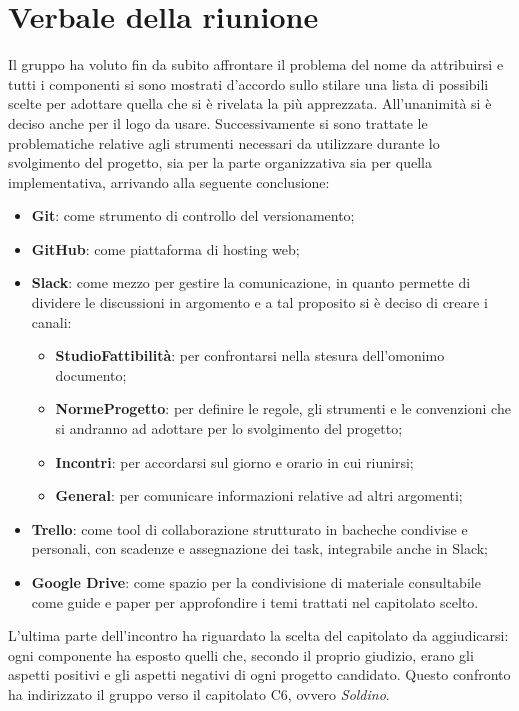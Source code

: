\section{Verbale della riunione}
Il gruppo ha voluto fin da subito affrontare il problema del nome da attribuirsi 
e tutti i componenti si sono mostrati d'accordo sullo stilare una lista di 
possibili scelte per adottare quella che si è rivelata la più apprezzata. 
All'unanimità si è deciso anche per il logo da usare. 
Successivamente si sono trattate le problematiche relative agli strumenti 
necessari da utilizzare durante lo svolgimento del progetto, sia per la parte 
organizzativa sia per quella implementativa, arrivando alla seguente 
conclusione:

\begin{itemize}
\item \textbf{Git}: come strumento di controllo del versionamento;
\item \textbf{GitHub}: come piattaforma di hosting web;
\item \textbf{Slack}: come mezzo per gestire la comunicazione, in quanto 
permette di dividere le discussioni in argomento e a tal proposito si è deciso 
di creare i canali:
	\begin{itemize}
		\item \textbf{StudioFattibilità}: per confrontarsi nella stesura dell'omonimo 
		documento;
		\item \textbf{NormeProgetto}: per definire le regole, gli strumenti e le 
		convenzioni che si andranno ad adottare per lo svolgimento del progetto;
		\item \textbf{Incontri}: per accordarsi sul giorno e orario in cui riunirsi;
		\item \textbf{General}: per comunicare informazioni relative ad altri 
		argomenti;
	\end{itemize}
\item \textbf{Trello}: come  tool di collaborazione strutturato in bacheche 
condivise e personali, con scadenze e assegnazione dei task, integrabile anche 
in Slack;
\item \textbf{Google Drive}: come spazio per la condivisione di materiale 
consultabile come guide e paper per approfondire i temi trattati nel capitolato 
scelto.
\end{itemize} 

\noindent L'ultima parte dell'incontro ha riguardato la scelta del capitolato da 
aggiudicarsi: ogni componente ha esposto quelli che, secondo il proprio 
giudizio, erano gli aspetti positivi e gli aspetti negativi di ogni progetto 
candidato. Questo confronto ha indirizzato il gruppo verso il capitolato C6,
ovvero \textit{Soldino}. 
\pagebreak
